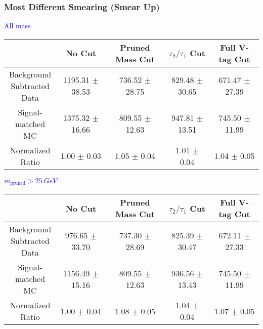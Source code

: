 \documentclass{beamer}
\begin{document}
\begin{frame}
  \frametitle{Most Different Smearing (Smear Up)}
  \begin{adjustwidth}{-1.5em}{-1.5em}
    \centering
    \vspace{6pt}
    \textcolor{blue}{All mass}
    \vspace{6pt}

    {\scriptsize
      \begin{tabular}{c | c | c | c | c}
        \hline
        & No Cut & Pruned Mass Cut & $\tau_2/\tau_1$ Cut & Full V-tag Cut \\
        \hline
        \makecell{Background \\ Subtracted \\ Data} & 1195.31 $\pm$ 38.53 & 736.52 $\pm$ 28.75 & 829.48 $\pm$ 30.65 & 671.47 $\pm$ 27.39 \\
        \makecell{Signal-\\ matched MC} & 1375.32 $\pm$ 16.66 & 809.55 $\pm$ 12.63 & 947.81 $\pm$ 13.51 & 745.50 $\pm$ 11.99 \\
        \hline
        \makecell{Normalized \\ Ratio} & 1.00 $\pm$ 0.03 & 1.05 $\pm$ 0.04 & 1.01 $\pm$ 0.04 & 1.04 $\pm$ 0.05 \\
        \hline
      \end{tabular}
    }
    
    \vspace{6pt}
    \textcolor{blue}{$m_\text{pruned} > \SI{25}{GeV}$}
    \vspace{6pt}

    {\scriptsize
      \begin{tabular}{c | c | c | c | c}
        \hline
        & No Cut & Pruned Mass Cut & $\tau_2/\tau_1$ Cut & Full V-tag Cut \\
        \hline
        \makecell{Background \\ Subtracted \\ Data} & 976.65 $\pm$ 33.70 & 737.30 $\pm$ 28.69 & 825.39 $\pm$ 30.47 & 672.11 $\pm$ 27.33 \\
        \makecell{Signal-\\ matched MC} & 1156.49 $\pm$ 15.16 & 809.55 $\pm$ 12.63 & 936.56 $\pm$ 13.43 & 745.50 $\pm$ 11.99 \\
        \hline
        \makecell{Normalized \\ Ratio} & 1.00 $\pm$ 0.04 & 1.08 $\pm$ 0.05 & 1.04 $\pm$ 0.04 & 1.07 $\pm$ 0.05 \\
        \hline
      \end{tabular}
    }
  \end{adjustwidth}
\end{frame}
\end{document}
